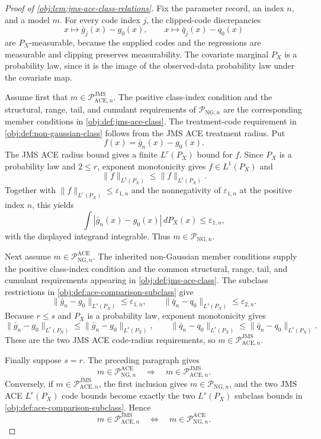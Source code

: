 \begin{proof}[Proof of \cref{obj:lem:jms-ace-class-relations}]
Fix the parameter record, an index \(n\), and a model \(m\).  For every code index \(j\), the clipped-code discrepancies
\[
x\longmapsto \bar g_j(x)-g_0(x),
\qquad
x\longmapsto \bar q_j(x)-q_0(x)
\]
are \(P_X\)-measurable, because the supplied codes and the regressions are measurable and clipping preserves measurability.  The covariate marginal \(P_X\) is a probability law, since it is the image of the observed-data probability law under the covariate map. %

Assume first that \(m\in\mathcal P_{\mathrm{ACE},n}^{\mathrm{JMS}}\).  The positive class-index condition and the structural, range, tail, and cumulant requirements of \(\mathcal P_{\mathrm{NG},n}\) are the corresponding member conditions in \cref{obj:def:jms-ace-class}.  The treatment-code requirement in \cref{obj:def:non-gaussian-class} follows from the JMS ACE treatment radius.  Put
\[
f(x)=\bar g_n(x)-g_0(x).
\]
The JMS ACE radius bound gives a finite \(L^r(P_X)\) bound for \(f\).  Since \(P_X\) is a probability law and \(2\le r\), exponent monotonicity gives \(f\in L^1(P_X)\) and
\[
\|f\|_{L^1(P_X)}
\le
\|f\|_{L^r(P_X)} .
\]
Together with \(\|f\|_{L^r(P_X)}\le\varepsilon_{1,n}\) and the nonnegativity of \(\varepsilon_{1,n}\) at the positive index \(n\), this yields
\[
\int |\bar g_n(x)-g_0(x)|\,dP_X(x)\le \varepsilon_{1,n},
\]
with the displayed integrand integrable.  Thus \(m\in\mathcal P_{\mathrm{NG},n}\). %

Next assume \(m\in\mathcal P_{\mathrm{NG},n}^{\mathrm{ACE}}\).  The inherited non-Gaussian member conditions supply the positive class-index condition and the common structural, range, tail, and cumulant requirements appearing in \cref{obj:def:jms-ace-class}.  The subclass restrictions in \cref{obj:def:ace-comparison-subclass} give
\[
\|\bar g_n-g_0\|_{L^s(P_X)}\le\varepsilon_{1,n},
\qquad
\|\bar q_n-q_0\|_{L^s(P_X)}\le\varepsilon_{2,n}.
\]
Because \(r\le s\) and \(P_X\) is a probability law, exponent monotonicity gives
\[
\|\bar g_n-g_0\|_{L^r(P_X)}
\le
\|\bar g_n-g_0\|_{L^s(P_X)},
\qquad
\|\bar q_n-q_0\|_{L^r(P_X)}
\le
\|\bar q_n-q_0\|_{L^s(P_X)} .
\]
These are the two JMS ACE code-radius requirements, so
\(m\in\mathcal P_{\mathrm{ACE},n}^{\mathrm{JMS}}\). %

Finally suppose \(s=r\).  The preceding paragraph gives
\[
m\in\mathcal P_{\mathrm{NG},n}^{\mathrm{ACE}}
\quad\Longrightarrow\quad
m\in\mathcal P_{\mathrm{ACE},n}^{\mathrm{JMS}} .
\]
Conversely, if \(m\in\mathcal P_{\mathrm{ACE},n}^{\mathrm{JMS}}\), the first inclusion gives \(m\in\mathcal P_{\mathrm{NG},n}\), and the two JMS ACE \(L^r(P_X)\) code bounds become exactly the two \(L^s(P_X)\) subclass bounds in \cref{obj:def:ace-comparison-subclass}.  Hence
\[
m\in\mathcal P_{\mathrm{ACE},n}^{\mathrm{JMS}}
\quad\Longleftrightarrow\quad
m\in\mathcal P_{\mathrm{NG},n}^{\mathrm{ACE}} .
\]
\end{proof}
